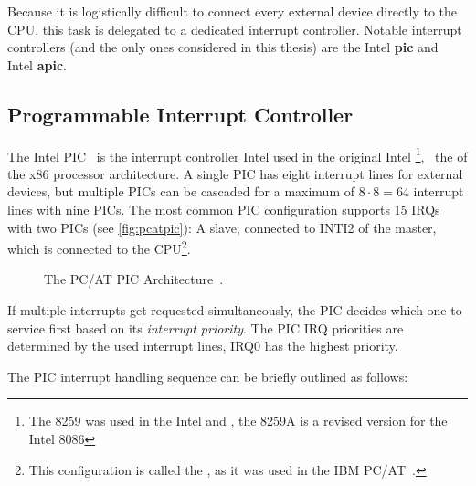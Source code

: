 Because it is logistically difficult to connect every external device directly to the CPU, this task is delegated to a dedicated interrupt controller.
Notable interrupt controllers (and the only ones considered in this thesis) are the Intel \textbf{\gls{pic}} and Intel \textbf{\gls{apic}}.

\subsection{Programmable Interrupt Controller}
\label{subsec:intelpic}

The Intel  PIC~\autocite{pic} is the interrupt controller Intel used in the original Intel \footnote{
  The 8259 was used in the Intel  and , the 8259A is a revised version for the Intel 8086},
\ the  of the x86 processor architecture.
A single PIC has eight interrupt lines for external devices, but multiple PICs can be cascaded for a maximum of \(8 \cdot 8 = 64\) interrupt lines with nine PICs.
The most common PIC configuration supports 15 IRQs with two PICs (see \autoref{fig:pcatpic}): A slave, connected to INTI2 of the master, which is connected to the CPU\footnote{
  This configuration is called the , as it was used in the IBM PC/AT~\autocite[sec.~1.13]{pcat}.}.

\begin{figure}[h]
  \centering
  \begin{subfigure}[b]{0.3\textwidth}
    
  \end{subfigure}
  \caption{The PC/AT PIC Architecture~\autocite[sec.~1.13]{pcat}.}
  \label{fig:pcatpic}
\end{figure}

If multiple interrupts get requested simultaneously, the PIC decides which one to service first based on its \textit{interrupt priority}.
The PIC IRQ priorities are determined by the used interrupt lines, IRQ0 has the highest priority.

The PIC interrupt handling sequence can be briefly outlined as follows:

